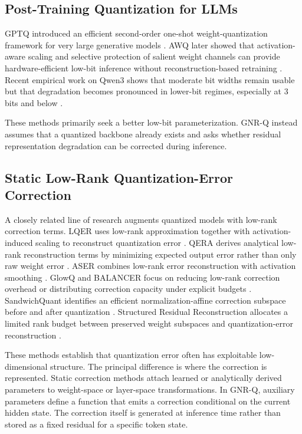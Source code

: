 \documentclass[11pt]{article}
\newcommand{\gnrq}{GNR-Q}
\begin{document}
\subsection{Post-Training Quantization for LLMs}

GPTQ introduced an efficient second-order one-shot weight-quantization framework for very large generative models \cite{frantar2022gptq}. AWQ later showed that activation-aware scaling and selective protection of salient weight channels can provide hardware-efficient low-bit inference without reconstruction-based retraining \cite{lin2024awq}. Recent empirical work on Qwen3 shows that moderate bit widths remain usable but that degradation becomes pronounced in lower-bit regimes, especially at 3 bits and below \cite{zheng2026qwen3quant}.

These methods primarily seek a better low-bit parameterization. \gnrq{} instead assumes that a quantized backbone already exists and asks whether residual representation degradation can be corrected during inference.

\subsection{Static Low-Rank Quantization-Error Correction}

A closely related line of research augments quantized models with low-rank correction terms. LQER uses low-rank approximation together with activation-induced scaling to reconstruct quantization error \cite{zhang2024lqer}. QERA derives analytical low-rank reconstruction terms by minimizing expected output error rather than only raw weight error \cite{zhang2025qera}. ASER combines low-rank error reconstruction with activation smoothing \cite{zhao2025aser}. GlowQ and BALANCER focus on reducing low-rank correction overhead or distributing correction capacity under explicit budgets \cite{an2026glowq,fan2026balancer}. SandwichQuant identifies an efficient normalization-affine correction subspace before and after quantization \cite{xia2026sandwich}. Structured Residual Reconstruction allocates a limited rank budget between preserved weight subspaces and quantization-error reconstruction \cite{cho2026srr}.

These methods establish that quantization error often has exploitable low-dimensional structure. The principal difference is where the correction is represented. Static correction methods attach learned or analytically derived parameters to weight-space or layer-space transformations. In \gnrq{}, auxiliary parameters define a function that emits a correction conditional on the current hidden state. The correction itself is generated at inference time rather than stored as a fixed residual for a specific token state.
\end{document}
